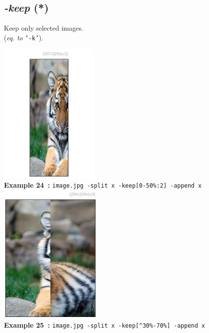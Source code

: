 \documentclass[a4paper,11pt,twoside]{book}
\begin{document}
\subsection{\emph{-keep} (*)}\vspace*{-0.5em}
Keep only selected images.
~\\(\emph{eq. to} {\small \texttt{'-k'}}).
\begin{center}\includegraphics[keepaspectratio=true,height=7cm,width=\textwidth]{img/gmic_def24.jpg}\\
{\footnotesize \textbf{Example 24~:} \texttt{image.jpg -split x -keep[0-50\%:2] -append x}}
\\\includegraphics[keepaspectratio=true,height=7cm,width=\textwidth]{img/gmic_def25.jpg}\\
{\footnotesize \textbf{Example 25~:} \texttt{image.jpg -split x -keep[\textasciicircum 30\%-70\%] -append x}}
\end{center}
\end{document}
